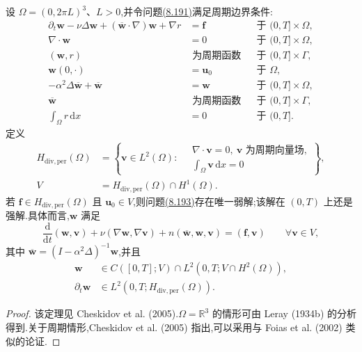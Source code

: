 \begin{theorem}[空间周期情形下解的存在唯一性]
\label{thm:leray-alpha-periodic-existence-uniqueness}
设 $\Omega=(0,2\pi L)^3$、$L>0$,并令问题\hyperref[eq:leray-alpha-model]{(8.191)}满足周期边界条件:
\begin{equation}\label{eq:leray-alpha-periodic-problem}
\begin{aligned}
 \partial_t\bm{w}-\nu\Delta\bm{w}
  +(\overline{\bm{w}}\cdot\nabla)\bm{w}+\nabla r
  &=\bm{f} &&\text{于 }(0,T]\times\Omega,\\
 \nabla\cdot\bm{w}&=0 &&\text{于 }(0,T]\times\Omega,\\
 (\bm{w},r)&\text{ 为周期函数} &&\text{于 }(0,T]\times\Gamma,\\
 \bm{w}(0,\cdot)&=\bm{u}_0 &&\text{于 }\Omega,\\
 -\alpha^2\Delta\overline{\bm{w}}+\overline{\bm{w}}
  &=\bm{w} &&\text{于 }(0,T]\times\Omega,\\
 \overline{\bm{w}}&\text{ 为周期函数} &&\text{于 }(0,T]\times\Gamma,\\
 \int_\Omega r\,\mathrm{d}x&=0 &&\text{于 }(0,T].
\end{aligned}
\end{equation}
定义
 \[
 \begin{aligned}
 H_{\mathrm{div,per}}(\Omega)
 &=\left\{\bm{v}\in L^2(\Omega):\quad
   \begin{array}{l}
    \nabla\cdot\bm{v}=0,\ 
    \bm{v}\text{ 为周期向量场},\\
    \int_\Omega\bm{v}\,\mathrm{d}x=0
   \end{array}\right\},\\
 V&=H_{\mathrm{div,per}}(\Omega)\cap H^1(\Omega).
 \end{aligned}
 \]
若 $\bm{f}\in H_{\mathrm{div,per}}(\Omega)$ 且 $\bm{u}_0\in V$,则问题\hyperref[eq:leray-alpha-periodic-problem]{(8.193)}存在唯一弱解;该解在 $(0,T)$ 上还是强解.具体而言,$\bm{w}$ 满足
\[
 \frac{\mathrm{d}}{\mathrm{d}t}(\bm{w},\bm{v})
 +\nu(\nabla\bm{w},\nabla\bm{v})
 +n(\overline{\bm{w}},\bm{w},\bm{v})
 =(\bm{f},\bm{v})\qquad\forall\bm{v}\in V,
\]
其中 $\overline{\bm{w}}=(I-\alpha^2\Delta)^{-1}\bm{w}$,并且
 \[
 \begin{aligned}
 \bm{w}&\in C([0,T];V)\cap L^2(0,T;V\cap H^2(\Omega)),\\
 \partial_t\bm{w}&\in L^2(0,T;H_{\mathrm{div,per}}(\Omega)).
 \end{aligned}
 \]
\begin{proof}
该定理见 Cheskidov et al. (2005).$\Omega=\mathbb{R}^3$ 的情形可由 Leray (1934b) 的分析得到.关于周期情形,Cheskidov et al. (2005) 指出,可以采用与 Foias et al. (2002) 类似的论证.
\end{proof}
\end{theorem}

